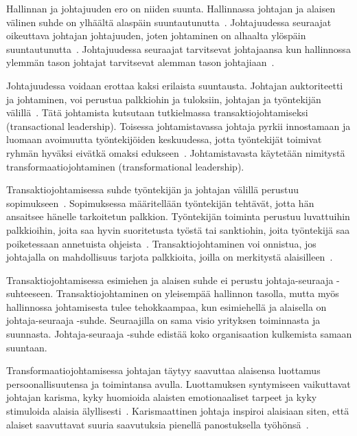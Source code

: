 \documentclass[finnish]{tktltiki2}
\theoremstyle{definition}
\theoremstyle{remark}
\begin{document}
Hallinnan ja johtajuuden ero on niiden suunta. Hallinnassa johtajan ja alaisen välinen suhde on ylhäältä alaspäin suuntautunutta~\cite{raccoon2006leadership}. Johtajuudessa seuraajat oikeuttava johtajan johtajuuden, joten johtaminen on alhaalta ylöspäin suuntautunutta~\cite{raccoon2006leadership}. Johtajuudessa seuraajat tarvitsevat johtajaansa kun hallinnossa ylemmän tason johtajat tarvitsevat alemman tason johtajiaan~\cite{raccoon2006leadership}.

Johtajuudessa voidaan erottaa kaksi erilaista suuntausta. Johtajan auktoriteetti ja johtaminen, voi perustua palkkiohin ja tuloksiin, johtajan ja työntekijän välillä~\cite{bass1990transactional}. Tätä johtamista kutsutaan tutkielmassa transaktiojohtamiseksi (transactional leadership). Toisessa johtamistavassa johtaja pyrkii innostamaan ja luomaan avoimuutta työntekijöiden keskuudessa, jotta työntekijät toimivat ryhmän hyväksi eivätkä omaksi edukseen~\cite{bass1990transactional}. Johtamistavasta käytetään nimitystä  transformaatiojohtaminen (transformational leadership).

Transaktiojohtamisessa suhde työntekijän ja johtajan välillä perustuu sopimukseen~\cite{bass1990transactional}. Sopimuksessa määritellään työntekijän tehtävät, jotta hän ansaitsee hänelle tarkoitetun palkkion. Työntekijän toiminta perustuu luvattuihin palkkioihin, joita saa hyvin suoritetusta työstä tai sanktiohin, joita työntekijä saa poiketessaan annetuista ohjeista~\cite{bass1990transactional}. Transaktiojohtaminen voi onnistua, jos johtajalla on mahdollisuus tarjota palkkioita, joilla on merkitystä alaisilleen~\cite{bass1990transactional}.

Transaktiojohtamisessa esimiehen ja alaisen suhde ei perustu johtaja-seuraaja -suhteeseen. Transaktiojohtaminen on yleisempää hallinnon tasolla, mutta myös hallinnossa johtamisesta tulee tehokkaampaa, kun esimiehellä ja alaisella on johtaja-seuraaja -suhde. Seuraajilla on sama visio yrityksen toiminnasta ja suunnasta. Johtaja-seuraaja -suhde edistää koko organisaation kulkemista samaan suuntaan.

Transformaatiojohtamisessa johtajan täytyy saavuttaa alaisensa luottamus persoonallisuutensa ja toimintansa avulla. Luottamuksen syntymiseen vaikuttavat johtajan karisma, kyky huomioida alaisten emotionaaliset tarpeet ja kyky stimuloida alaisia älyllisesti~\cite{bass1990transactional}. Karismaattinen johtaja inspiroi alaisiaan siten, että alaiset saavuttavat suuria saavutuksia pienellä panostuksella työhönsä~\cite{bass1990transactional}.
\end{document}
